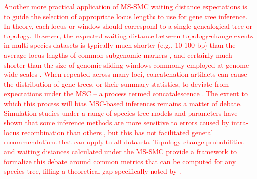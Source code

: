\documentclass[11pt]{article}
\begin{document}
\textcolor{red}{
Another more practical application of MS-SMC waiting distance expectations
is to guide the selection of appropriate locus lengths to use for gene
tree inference. In theory, each locus or window should correspond to a
single genealogical tree or topology.
% 
However, the expected waiting distance between topology-change events in
multi-species datasets is typically much shorter (e.g., 10-100 bp) than the 
average locus lengths of common subgenomic markers 
\citep[e.g., $>$300 bp;][]{mckenzie_multispecies_2020},
and certainly much shorter than the size of genomic sliding windows 
commonly employed at genome-wide scales 
\citep[e.g., 100 Kb;][]{li2019recombination}.
When repeated across many loci, concatenation artifacts can cause the distribution
of gene trees, or their summary statistics, to deviate from expectations under
the MSC -- a process termed concatalescence \citep{gatesy_concatenation_2013}.
% 
The extent to which this process will bias MSC-based inferences remains
a matter of debate.
Simulation studies under a range of species tree models and parameters
have shown that some inference methods are more sensitive to errors caused
by intra-locus recombination than others
\citep{lanier2012recombination,zhu2022simulation}, but this has not 
facilitated general recommendations that can apply to all datasets.
% 
Topology-change probabilities and waiting distances calculated under
the MS-SMC provide a framework to formalize this debate around common
metrics that can be computed for any species tree, filling a theoretical
gap specifically noted by \citet{zhu2022simulation}.
}

\end{document}

